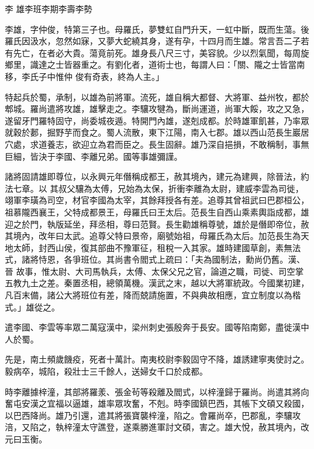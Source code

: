 
\begin{pinyinscope}

 李
 雄李班李期李壽李勢



 李雄，字仲俊，特第三子也。母羅氏，夢雙虹自門升天，一虹中斷，既而生蕩。後羅氏因汲水，忽然如寐，又夢大蛇繞其身，遂有孕，十四月而生雄。常言吾二子若有先亡，在者必大貴。蕩竟前死。雄身長八尺三寸，美容貌。少以烈氣聞，每周旋鄉里，識達之士皆器重之。有劉化者，道術士也，每謂人曰：「關、隴之士皆當南移，李氏子中惟仲
 俊有奇表，終為人主。」



 特起兵於蜀，承制，以雄為前將軍。流死，雄自稱大都督、大將軍、益州牧，都於郫城。羅尚遣將攻雄，雄擊走之。李驤攻犍為，斷尚運道，尚軍大餒，攻之又急，遂留牙門羅特固守，尚委城夜遁。特開門內雄，遂剋成都。於時雄軍飢甚，乃率眾就穀於郪，掘野芋而食之。蜀人流散，東下江陽，南入七郡。雄以西山范長生巖居穴處，求道養志，欲迎立為君而臣之。長生固辭。雄乃深自挹損，不敢稱制，事無巨細，皆決于李國、李離兄弟。國等事雄彌謹。



 諸將固請雄即尊位，以永興元年僭稱成都王，赦其境內，建元為建興，除晉法，約法七章。以
 其叔父驤為太傅，兄始為太保，折衝李離為太尉，建威李雲為司徙，翊軍李璜為司空，材官李國為太宰，其餘拜授各有差。追尊其曾祖武曰巴郡桓公，祖慕隴西襄王，父特成都景王，母羅氏曰王太后。范長生自西山乘素輿詣成都，雄迎之於門，執版延坐，拜丞相，尊曰范賢。長生勸雄稱尊號，雄於是僭即帝位，赦其境內，改年曰太武。追尊父特曰景帝，廟號始祖，母羅氏為太后。加范長生為天地太師，封西山侯，復其部曲不豫軍征，租稅一入其家。雄時建國草創，素無法式，諸將恃恩，各爭班位。其尚書令閻式上疏曰：「夫為國制法，勳尚仍舊。漢、晉
 故事，惟太尉、大司馬執兵，太傅、太保父兄之官，論道之職，司徙、司空掌五教九土之差。秦置丞相，總領萬機。漢武之末，越以大將軍統政。今國業初建，凡百末備，諸公大將班位有差，降而兢請施置，不與典故相應，宜立制度以為楷式。」雄從之。



 遣李國、李雲等率眾二萬寇漢中，梁州刺史張殷奔于長安。國等陷南鄭，盡徙漢中人於蜀。



 先是，南土頻歲饑疫，死者十萬計。南夷校尉李毅固守不降，雄誘建寧夷使討之。毅病卒，城陷，殺壯士三千餘人，送婦女千口於成都。



 時李離據梓潼，其部將羅羕、張金茍等殺離及閻式，以梓潼歸于羅尚。尚遣其將向
 奮屯安漢之宜福以逼雄，雄率眾攻奮，不剋。時李國鎮巴西，其帳下文碩又殺國，以巴西降尚。雄乃引還，遣其將張寶襲梓潼，陷之。會羅尚卒，巴郡亂，李驤攻涪，又陷之，執梓潼太守譙登，遂乘勝進軍討文碩，害之。雄大悅，赦其境內，改元曰玉衡。




\end{pinyinscope}
